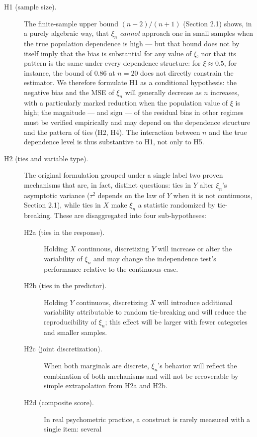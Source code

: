 \documentclass[article]{ajs}
\begin{document}
\begin{description}
\item[H1 (sample size).] The finite-sample upper bound $(n-2)/(n+1)$
  (Section 2.1) shows, in a purely algebraic way, that $\xi_n$
  \emph{cannot} approach one in small samples when the true population
  dependence is high --- but that bound does not by itself imply that
  the bias is substantial for any value of $\xi$, nor that its pattern
  is the same under every dependence structure: for $\xi \approx 0.5$,
  for instance, the bound of $0.86$ at $n=20$ does not directly
  constrain the estimator. We therefore formulate H1 as a conditional
  hypothesis: the negative bias and the MSE of $\xi_n$ will generally
  decrease as $n$ increases, with a particularly marked reduction when the
  population value of $\xi$ is high; the magnitude --- and sign --- of
  the residual bias in other regimes must be verified empirically and
  may depend on the dependence structure and the pattern of ties (H2,
  H4). The interaction between $n$ and the true dependence level is
  thus substantive to H1, not only to H5.
\item[H2 (ties and variable type).] The original formulation grouped
  under a single label two proven mechanisms that are, in fact,
  distinct questions: ties in $Y$ alter $\xi_n$'s asymptotic variance
  ($\tau^2$ depends on the law of $Y$ when it is not continuous,
  Section 2.1), while ties in $X$ make $\xi_n$ a statistic randomized
  by tie-breaking. These are disaggregated into four sub-hypotheses:
  \begin{description}
  \item[H2a (ties in the response).] Holding $X$ continuous,
    discretizing $Y$ will increase or alter the variability of
    $\xi_n$ and may change the independence test's performance
    relative to the continuous case.
  \item[H2b (ties in the predictor).] Holding $Y$ continuous,
    discretizing $X$ will introduce additional variability
    attributable to random tie-breaking and will reduce the
    reproducibility of $\xi_n$; this effect will be larger with fewer
    categories and smaller samples.
  \item[H2c (joint discretization).] When both marginals are discrete,
    $\xi_n$'s behavior will reflect the combination of both
    mechanisms and will not be recoverable by simple extrapolation
    from H2a and H2b.
  \item[H2d (composite score).] In real psychometric practice, a
    construct is rarely measured with a single item: several

\end{description}
\end{description}
\end{document}

